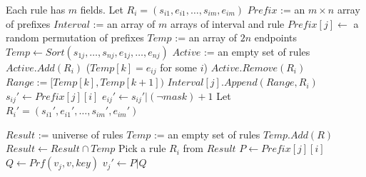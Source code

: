 \begin{framed}
\begin{algorithmic}[1]

  \State Each rule has $m$ fields. Let $R_i = (s_{i1}, e_{i1}, \dots, s_{im}, e_{im})$
  \State $Prefix$ := an $m \times n$ array of prefixes 
  \State $Interval$ := an array of $m$ arrays of interval and rule
    \State $Prefix[j] \gets$ a random permutation of prefixes
    \State $Temp$ := an array of $2n$ endpoints
    \State $Temp \gets Sort(s_{1j}, \dots, s_{nj}, e_{1j}, \dots, e_{nj})$
    \State $Active$ := an empty set of rules
        \State $Active.Add(R_i)$
      \Else
        \State ($Temp[k] = e_{ij}$ for some $i$)
        \State $Active.Remove(R_i)$
      \EndIf
      \State $Range := [Temp[k], Temp[k+1])$
        \State $Interval[j].Append(Range, R_i)$
      \EndFor
    \EndFor
  \EndFor
      \State $s_{ij}' \gets Prefix[j][i]$
      \State $e_{ij}' \gets s_{ij}' | (\lnot mask) + 1$
    \EndFor
    \State Let $R_i' = (s_{i1}', e_{i1}', \dots, s_{im}', e_{im}')$
  \EndFor
  \State {}
\EndProcedure

  \State $Result$ := universe of rules
    \State $Temp$ := an empty set of rules
      \State $Temp.Add(R)$
    \EndFor
    \State $Result \gets Result \cap Temp$
  \EndFor
  \State Pick a rule $R_i$ from $Result$ 
    \State $P \gets Prefix[j][i]$
    \State $Q \gets Prf(v_j, v, key)$
    \State $v_j' \gets P | Q $ 
  \EndFor
  \State {}
\EndProcedure

\end{algorithmic}
\end{framed}




